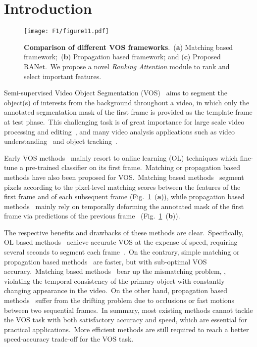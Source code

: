 \documentclass[10pt,twocolumn,letterpaper]{article}
\begin{document}
\vspace{-2mm}
\section{Introduction}
\begin{figure}[t]
\vspace{-2mm}
\begin{center}
\texttt{[image: F1/figure11.pdf]}
\end{center}
\vspace{-6mm}
\caption{\textbf{Comparison of different VOS frameworks}.\ (\textbf{a}) Matching based framework;\ (\textbf{b}) Propagation based framework; and (\textbf{c}) Proposed RANet.\ We propose a novel \textsl{Ranking Attention} module to rank and select important features.}
\label{fig:intro}
\vspace{-6mm}
\end{figure}

Semi-supervised Video Object Segmentation (VOS)~\cite{davis2016,davis2017,davis2018} aims to segment the object(s) of interests from the background throughout a video, in which only the annotated segmentation mask of the first frame is provided as the template frame at test phase.\ This challenging task is of great importance for large scale video processing and editing~\cite{semi02,semi01,zsvos}, and many video analysis applications such as video understanding~\cite{Fan2019VideoSal,un02} and object tracking~\cite{siammask}.\ 

Early VOS methods~\cite{osvos, masktrack, osvos-s, onavos} mainly resort to online learning (OL) techniques which fine-tune a pre-trained classifier on its first frame.\ Matching or propagation based methods have also been proposed for VOS.\ Matching based methods~\cite{videomatch, pml} segment pixels according to the pixel-level matching scores between the features of the first frame and of each subsequent frame (Fig.~\ref{fig:intro}\ (\textbf{a})), while propagation based methods~\cite{masktrack, rgmp, favos, osmn, sfl, semi02} mainly rely on temporally deforming the annotated mask of the first frame via predictions of the previous frame~\cite{masktrack} (Fig.~\ref{fig:intro}\ (\textbf{b})).

The respective benefits and drawbacks of these methods are clear.\ Specifically, OL based methods~\cite{osvos, masktrack, osvos-s, onavos} achieve accurate VOS at the expense of speed, requiring several seconds to segment each frame~\cite{osvos}.\ On the contrary, simple matching or propagation based methods~\cite{masktrack,pml,plm} are faster, but with sub-optimal VOS accuracy.\ Matching based methods~\cite{videomatch, pml, rgmp} bear up the mismatching problem, \ie, violating the temporal consistency of the primary object with constantly changing appearance in the video.\ On the other hand, propagation based methods~\cite{masktrack, rgmp, favos, osmn, sfl, ofl} suffer from the drifting problem due to occlusions or fast motions between two sequential frames.\ In summary, most existing methods cannot tackle the VOS task with both satisfactory accuracy and speed, which are essential for practical applications.\ More efficient methods are still required to reach a better speed-accuracy trade-off for the VOS task. 
\end{document}
